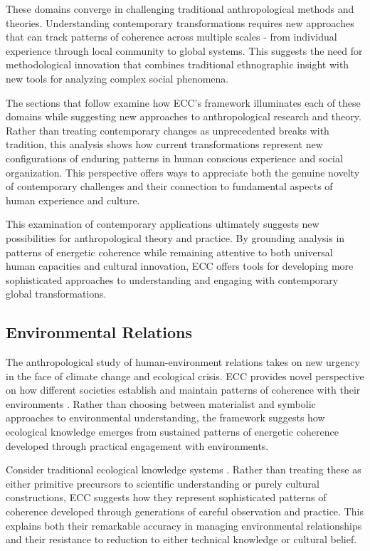 These domains converge in challenging traditional anthropological methods and theories. Understanding contemporary transformations requires new approaches that can track patterns of coherence across multiple scales - from individual experience through local community to global systems. This suggests the need for methodological innovation that combines traditional ethnographic insight with new tools for analyzing complex social phenomena.

The sections that follow examine how ECC's framework illuminates each of these domains while suggesting new approaches to anthropological research and theory. Rather than treating contemporary changes as unprecedented breaks with tradition, this analysis shows how current transformations represent new configurations of enduring patterns in human conscious experience and social organization. This perspective offers ways to appreciate both the genuine novelty of contemporary challenges and their connection to fundamental aspects of human experience and culture.

This examination of contemporary applications ultimately suggests new possibilities for anthropological theory and practice. By grounding analysis in patterns of energetic coherence while remaining attentive to both universal human capacities and cultural innovation, ECC offers tools for developing more sophisticated approaches to understanding and engaging with contemporary global transformations.

\subsection{Environmental Relations}

The anthropological study of human-environment relations takes on new urgency in the face of climate change and ecological crisis. ECC provides novel perspective on how different societies establish and maintain patterns of coherence with their environments \cite{ingold2000perception}. Rather than choosing between materialist and symbolic approaches to environmental understanding, the framework suggests how ecological knowledge emerges from sustained patterns of energetic coherence developed through practical engagement with environments.

Consider traditional ecological knowledge systems \cite{berkes2012sacred}. Rather than treating these as either primitive precursors to scientific understanding or purely cultural constructions, ECC suggests how they represent sophisticated patterns of coherence developed through generations of careful observation and practice. This explains both their remarkable accuracy in managing environmental relationships and their resistance to reduction to either technical knowledge or cultural belief.

